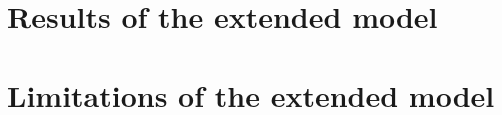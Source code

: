 \documentclass{article}
\begin{document}





\section{Results of the extended model}






\section{Limitations of the extended model}










\end{document}
